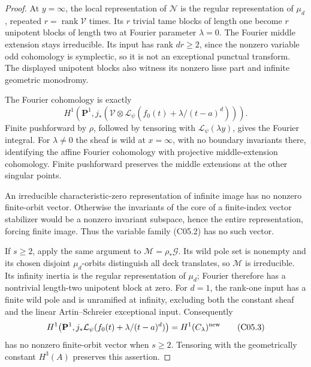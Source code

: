 \documentclass[11pt]{article}
\theoremstyle{remark}\newtheorem{remark}[theorem]{Remark}
\begin{document}
\begin{proof}
At \(y=\infty\), the local representation of \(\mathcal N\) is the
regular representation of \(\mu_d\), repeated
\(r=\operatorname{rank}\mathcal V\) times. Its \(r\) trivial tame
blocks of length one become \(r\) unipotent blocks of length two at
Fourier parameter \(\lambda=0\). The Fourier middle extension stays
irreducible. Its input has rank \(dr\ge2\), since the nonzero variable
odd cohomology is symplectic, so it is not an exceptional punctual
transform. The displayed unipotent blocks also witness its nonzero
lisse part and infinite geometric monodromy.

The Fourier cohomology is exactly
\[
 H^1\!\left(\mathbf P^1,
   j_*(\mathcal V\otimes
      \mathcal L_\psi(f_0(t)+\lambda/(t-a)^d))\right).     \tag{C05.2}
\]
Finite pushforward by \(\rho\), followed by tensoring with
\(\mathcal L_\psi(\lambda y)\), gives the Fourier integral.
For \(\lambda\ne0\) the sheaf is wild at \(x=\infty\), with no
boundary invariants there, identifying the affine Fourier cohomology
with projective middle-extension cohomology. Finite pushforward
preserves the middle extensions at the other singular points.

An irreducible characteristic-zero representation of infinite image
has no nonzero finite-orbit vector. Otherwise the invariants of the
core of a finite-index vector stabilizer would be a nonzero invariant
subspace, hence the entire representation, forcing finite image.
Thus the variable family (C05.2) has no such vector.

If \(s\ge2\), apply the same argument to
\(\mathcal M=\rho_*\mathcal G\). Its wild pole set is nonempty
and its chosen disjoint \(\mu_d\)-orbits distinguish all deck
translates, so \(\mathcal M\) is irreducible. Its infinity inertia
is the regular representation of \(\mu_d\); Fourier therefore has
a nontrivial length-two unipotent block at zero.
For \(d=1\), the rank-one input has a finite wild pole and is
unramified at infinity, excluding both the constant sheaf and the
linear Artin--Schreier exceptional input. Consequently
\[
 H^1\!\left(\mathbf P^1,
 j_*\mathcal L_\psi(f_0(t)+\lambda/(t-a)^d)\right)
       =H^1(C_\lambda)^{\rm new}                         \tag{C05.3}
\]
has no nonzero finite-orbit vector when \(s\ge2\).
Tensoring with the geometrically constant \(H^3(A)\) preserves
this assertion.


\end{proof}
\end{document}
